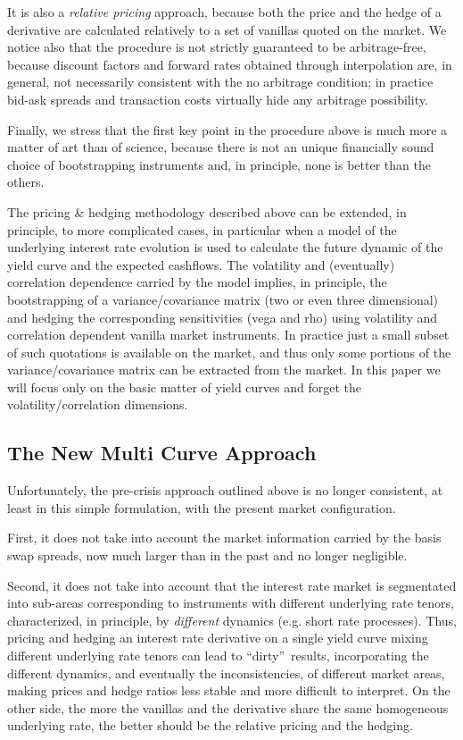 \documentclass[11pt,reqno]{amsart}
\begin{document}
It is also a \emph{relative pricing} approach, because both the price and the hedge of a derivative are calculated relatively to a set of vanillas quoted on the market. We notice also that the procedure is not strictly guaranteed to be arbitrage-free, because discount factors and forward rates obtained through interpolation are, in general, not necessarily consistent with the no arbitrage condition; in practice bid-ask spreads and transaction costs virtually hide any arbitrage possibility.

Finally, we stress that the first key point in the procedure above is much more a matter of art than of science, because there is not an unique financially sound choice of bootstrapping instruments and, in principle, none is better than the others.

The pricing \& hedging methodology described above can be extended, in principle, to more complicated cases, in particular when a model of the underlying interest rate evolution is used to calculate the future dynamic of the yield curve and the expected cashflows. The volatility and (eventually) correlation dependence carried by the model implies, in principle, the bootstrapping of a variance/covariance matrix (two or even three dimensional) and hedging the corresponding sensitivities (vega and rho) using volatility and correlation dependent vanilla market instruments. In practice just a small subset of such quotations is available on the market, and thus only some portions of the variance/covariance matrix can be extracted from the market. In this paper we will focus only on the basic matter of yield curves and forget the volatility/correlation dimensions.

\subsection{\label{SecMultiCurve}The New Multi Curve Approach}
Unfortunately, the pre-crisis approach outlined above is no longer consistent, at least in this simple formulation, with the present market configuration.

First, it does not take into account the market information carried by the basis swap spreads, now much larger than in the past and no longer negligible.

Second, it does not take into account that the interest rate market is segmentated into sub-areas corresponding to instruments with different underlying rate tenors, characterized, in principle, by \emph{different} dynamics (e.g. short rate processes). Thus, pricing and hedging an interest rate derivative on a single yield curve mixing different underlying rate tenors can lead to \textquotedblleft dirty\textquotedblright\ results, incorporating the different dynamics, and eventually the inconsistencies, of different market areas, making prices and hedge ratios less stable and more difficult to interpret. On the other side, the more the vanillas and the derivative share the same homogeneous underlying rate, the better should be the relative pricing and the hedging.
\end{document}

